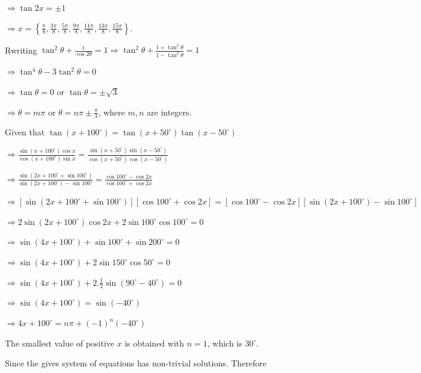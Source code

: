   $\Rightarrow \tan2x = \pm 1$

  $\Rightarrow x
  = \left\{\frac{\pi}{8}, \frac{3\pi}{8}, \frac{5\pi}{8}, \frac{9\pi}{8}, \frac{11\pi}{8}, \frac{13\pi}{8}, \frac{15\pi}{8}\right\}$.
\item Rwriting $\tan^2\theta + \frac{1}{\cos2\theta} = 1 \Rightarrow \tan^2\theta + \frac{1
  + \tan^2\theta}{1 - \tan^2\theta} = 1$

  $\Rightarrow \tan^4\theta - 3\tan^2\theta = 0$

  $\Rightarrow \tan\theta = 0$ or $\tan\theta = \pm\sqrt{3}$

  $\Rightarrow \theta = m\pi$ or $\theta = n\pi\pm\frac{\pi}{3}$, where $m, n$ are integers.
\item Given that $\tan\left(x + 100^\circ\right) = \tan\left(x + 50^\circ\right)\tan\left(x -
  50^\circ\right)$

  $\Rightarrow \frac{\sin\left(x + 100^\circ\right)\cos x}{\cos\left(x + 100^\circ\right)\sin x}
  = \frac{\sin\left(x + 50^\circ\right)\sin\left(x - 50^\circ\right)}{\cos\left(x +
    50^\circ\right)\cos\left(x - 50^\circ\right)}$

  $\Rightarrow \frac{\sin\left(2x + 100^\circ + \sin100^\circ\right)}{\sin\left(2x + 100^\circ\right)
    - \sin100^\circ} = \frac{\cos100^\circ - \cos2x}{\cos100^\circ + \cos 2x}$

  $\Rightarrow \left[\sin\left(2x + 100^\circ + \sin100^\circ\right)\right]\left[\cos100^\circ + \cos
    2x\right] = \left[\cos100^\circ - \cos2x\right]\left[\sin\left(2x + 100^\circ\right)
    - \sin100^\circ\right]$

  $\Rightarrow 2\sin\left(2x + 100^\circ\right)\cos2x + 2\sin100^\circ\cos100^\circ = 0$

  $\Rightarrow \sin\left(4x + 100^\circ\right) + \sin100^\circ + \sin200^\circ = 0$

  $\Rightarrow \sin\left(4x + 100^\circ\right) + 2\sin150^\circ\cos50^\circ = 0$

  $\Rightarrow \sin\left(4x + 100^\circ\right) + 2.\frac{1}{2}\sin\left(90^\circ - 40^\circ\right) = 0$

  $\Rightarrow \sin\left(4x + 100^\circ\right) = \sin\left(-40^\circ\right)$

  $\Rightarrow 4x + 100^\circ = n\pi + (-1)^n\left(-40^\circ\right)$

  The smallest value of positive $x$ is obtained with $n = 1$, which is $30^\circ$.
\item Since the gives system of equations has non-trivial solutions. Therefore

